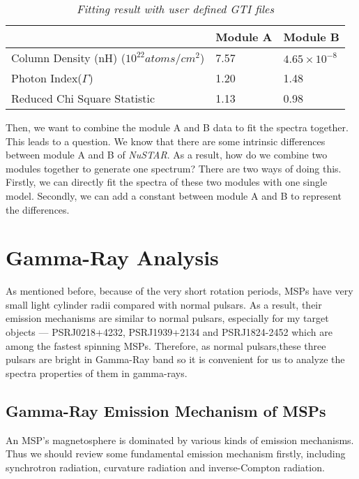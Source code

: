 \documentclass[12pt]{report}
\newcommand{\mycaption}[1]{\caption{\textit{\footnotesize #1}}}
\begin{document}
          \begin{table}[!h]   
            \centering
            \begin{tabular}{| m{4cm} | m{3cm} | m{3cm} |}
              \hline
              & Module A & Module B\\
              \hline
              Column Density (nH) ($10^{22} atoms/cm^2$) & 7.57 & $4.65\times10^{-8}$\\ 
              \hline
              Photon Index($\Gamma$) & 1.20 & 1.48 \\
              \hline 
              Reduced Chi Square Statistic & 1.13 & 0.98 \\
              \hline 
            \end{tabular}
            \mycaption{Fitting result with user defined GTI files}
            \label{table:spectra_usrgti}
          \end{table}

          Then, we want to combine the module A and B data to fit the spectra together. This leads to a question.
          We know that there are some intrinsic differences between module A and B of \textit{NuSTAR}. As a result,
          how do we combine two modules together to generate one spectrum? There are two ways of doing this. Firstly,
          we can directly fit the spectra of these two modules with one single model. Secondly, we can add a 
          constant between module A and B to represent the differences. %


  \chapter{Gamma-Ray Analysis}
      As mentioned before, because of the very short rotation periods, MSPs have very small light cylinder radii 
      compared with normal pulsars. As a result, their emission mechanisms are similar to normal pulsars, 
      especially for my target objects --- PSRJ0218+4232, PSRJ1939+2134 and PSRJ1824-2452
      which are among the fastest spinning MSPs. Therefore, as normal pulsars,these three 
      pulsars are bright in Gamma-Ray band so it is convenient for us to analyze the spectra 
      properties of them in gamma-rays.


      \section{Gamma-Ray Emission Mechanism of MSPs}
        An MSP's magnetosphere is dominated by various kinds of emission mechanisms. Thus we should review some 
        fundamental emission mechanism firstly, including synchrotron radiation, curvature radiation and 
        inverse-Compton radiation.
        
\end{document}
